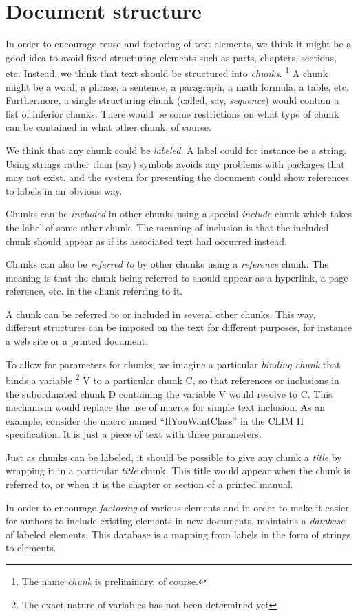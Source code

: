 \chapter{Document structure}
\label{chap-document-structure}

In order to encourage reuse and factoring of text elements, we think
it might be a good idea to avoid fixed structuring elements such as
parts, chapters, sections, etc.  Instead, we think that text should be
structured into \emph{chunks}.%
\footnote{The name \emph{chunk} is preliminary, of course.}
A chunk might be a word, a phrase, a sentence, a paragraph, a math
formula, a table, etc.  Furthermore, a single structuring chunk
(called, say, \emph{sequence}) would contain a list of inferior
chunks.  There would be some restrictions on what type of chunk can be
contained in what other chunk, of course.  

We think that any chunk could be \emph{labeled}.  A label could for
instance be a \commonlisp{} string.  Using strings rather than (say)
symbols avoids any problems with packages that may not exist, and the
system for presenting the document could show references to labels in
an obvious way.

Chunks can be \emph{included} in other chunks using a special
\emph{include} chunk which takes the label of some other chunk.
The meaning of inclusion is that the included chunk should appear as
if its associated text had occurred instead.  

Chunks can also be \emph{referred to} by other chunks using a
\emph{reference} chunk.  The meaning is that the chunk being referred
to should appear as a hyperlink, a page reference, etc. in the chunk
referring to it. 

A chunk can be referred to or included in several other chunks.  This
way, different structures can be imposed on the text for different
purposes, for instance a web site or a printed document. 

To allow for parameters for chunks, we imagine a particular
\emph{binding chunk} that binds a variable%
\footnote{The exact nature of variables has not been determined yet} V
to a particular chunk C, so that references or inclusions in the
subordinated chunk D containing the variable V would resolve to C.
This mechanism would replace the use of macros for simple text
inclusion.  As an example, consider the macro named ``IfYouWantClass''
in the CLIM II specification.  It is just a piece of text with three
parameters.

Just as chunks can be labeled, it should be possible to give any chunk
a \emph{title} by wrapping it in a particular \emph{title} chunk.
This title would appear when the chunk is referred to, or when it is
the chapter or section of a printed manual.

In order to encourage \emph{factoring} of various elements and in
order to make it easier for authors to include existing elements in
new documents, \sysname{} maintains a \emph{database} of labeled
elements.  This database is a mapping from labels in the form of
\commonlisp{} strings to elements.
